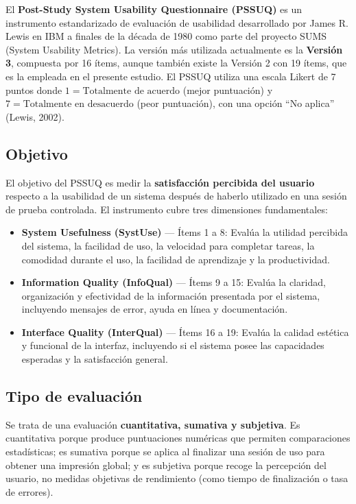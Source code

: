 \documentclass[a4paper,12pt]{report}
\begin{document}
El \textbf{Post-Study System Usability Questionnaire (PSSUQ)} es un instrumento estandarizado de evaluación de usabilidad desarrollado por James R. Lewis en IBM a finales de la década de 1980 como parte del proyecto SUMS (System Usability Metrics). La versión más utilizada actualmente es la \textbf{Versión 3}, compuesta por 16 ítems, aunque también existe la Versión 2 con 19 ítems, que es la empleada en el presente estudio. El PSSUQ utiliza una escala Likert de 7 puntos donde $1 = \text{Totalmente de acuerdo}$ (mejor puntuación) y $7 = \text{Totalmente en desacuerdo}$ (peor puntuación), con una opción ``No aplica'' (Lewis, 2002).

\subsection{Objetivo}

El objetivo del PSSUQ es medir la \textbf{satisfacción percibida del usuario} respecto a la usabilidad de un sistema después de haberlo utilizado en una sesión de prueba controlada. El instrumento cubre tres dimensiones fundamentales:

\begin{itemize}
    \item \textbf{System Usefulness (SystUse)} — Ítems 1 a 8: Evalúa la utilidad percibida del sistema, la facilidad de uso, la velocidad para completar tareas, la comodidad durante el uso, la facilidad de aprendizaje y la productividad.
    \item \textbf{Information Quality (InfoQual)} — Ítems 9 a 15: Evalúa la claridad, organización y efectividad de la información presentada por el sistema, incluyendo mensajes de error, ayuda en línea y documentación.
    \item \textbf{Interface Quality (InterQual)} — Ítems 16 a 19: Evalúa la calidad estética y funcional de la interfaz, incluyendo si el sistema posee las capacidades esperadas y la satisfacción general.
\end{itemize}

\subsection{Tipo de evaluación}

Se trata de una evaluación \textbf{cuantitativa, sumativa y subjetiva}. Es cuantitativa porque produce puntuaciones numéricas que permiten comparaciones estadísticas; es sumativa porque se aplica al finalizar una sesión de uso para obtener una impresión global; y es subjetiva porque recoge la percepción del usuario, no medidas objetivas de rendimiento (como tiempo de finalización o tasa de errores).
\end{document}
